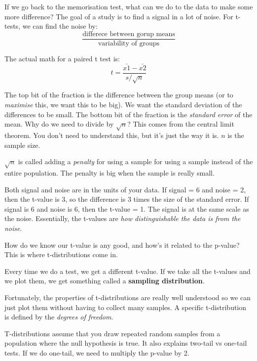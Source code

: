 \documentclass[11pt,a4paper,titlepage]{scrartcl}
\begin{document}
If we go back to the memorisation test, what can we do to the data to make
some more difference? The goal of a study is to find a signal in a lot of
noise. For t-tests, we can find the noise by:
\begin{equation*}
    \frac{\text{differece between gorup means}}{\text{variability of
    groups}}
\end{equation*}

The actual math for a paired t test is:
\begin{equation*}
    t = \frac{\bar {x1} - \bar {x2}}{s/\sqrt{n}}
\end{equation*}

The top bit of the fraction is the difference between the group means (or
to \textit{maximise} this, we want this to be big). We want the standard
deviation of the differences to be small. The bottom bit of the fraction
is the \textit{standard error} of the mean. Why do we need to divide by
$\sqrt n$? This comes from the central limit theorem. You don't need to
understand this, but it's just the way it is. $n$ is the sample size.

$\sqrt n$ is called adding a \textit{penalty} for using a sample for using
a sample instead of the entire population. The penalty is big when the
sample is really small.

Both signal and noise are in the units of your data. If signal = 6 and
noise = 2, then the t-value is 3, so the difference is 3 times the size of
the standard error. If signal is 6 and noise is 6, then the t-value = 1.
The signal is at the same scale as the noise. Essentially, the t-values
are \textit{how distinguishable the data is from the noise}.

How do we know our t-value is any good, and how's it related to the
p-value? This is where t-distributions come in.

Every time we do a test, we get a different t-value. If we take all the
t-values and we plot them, we get something called a \textbf{sampling
distribution}.

Fortunately, the properties of t-distributions are really well understood
so we can just plot them without having to collect many samples. A
specific t-distribution is defined by the \textit{degrees of freedom}.

T-distributions assume that you draw repeated random samples from a
population where the null hypothesis is true. It also explains two-tail vs
one-tail tests. If we do one-tail, we need to multiply the p-value by 2.
\end{document}
